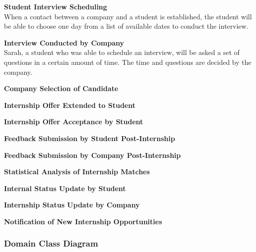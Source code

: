 {\begin{enumerate}[label=\textbf{[\arabic*]}, left = 0 pt, align = left]
\item \textbf{Student Interview Scheduling}  
\\When a contact between a company and a student is established, the student will be able to choose one day from a list of available dates to conduct the interview.
\item \textbf{Interview Conducted by Company}                        
\\ Sarah, a student who was able to schedule an interview, will be asked a set of questions in a certain amount of time. The time and questions are decided by the company.
\item \textbf{Company Selection of Candidate}                        
\\
\item \textbf{Internship Offer Extended to Student}                  
\\
\item \textbf{Internship Offer Acceptance by Student}                
\\
\item \textbf{Feedback Submission by Student Post-Internship}        
\\
\item \textbf{Feedback Submission by Company Post-Internship}        
\\
\item \textbf{Statistical Analysis of Internship Matches}            
\\
\item \textbf{Internal Status Update by Student}                     
\\
\item \textbf{Internship Status Update by Company}                   
\\
\item \textbf{Notification of New Internship Opportunities}          
\\

\end{enumerate}
}
\subsubsection{Domain Class Diagram}

